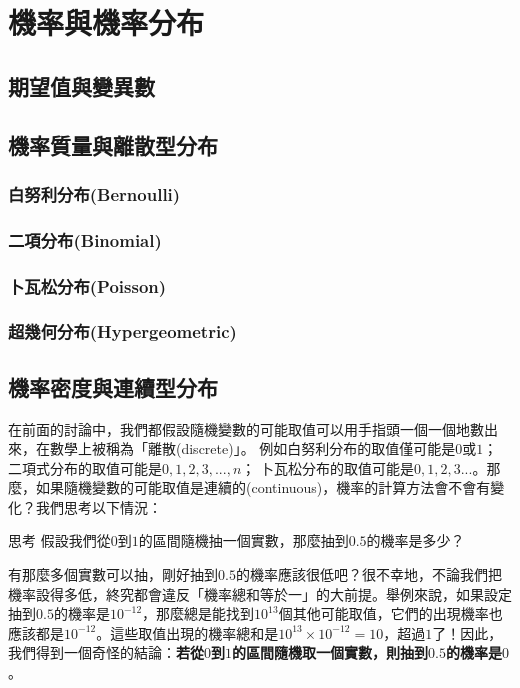 \chapter{機率與機率分布}

\section{期望值與變異數}

\section{機率質量與離散型分布}

\subsection{白努利分布(Bernoulli)}

\subsection{二項分布(Binomial)}

\subsection{卜瓦松分布(Poisson)}

\subsection{超幾何分布(Hypergeometric)}

\section{機率密度與連續型分布}
在前面的討論中，我們都假設隨機變數的可能取值可以用手指頭一個一個地數出來，在數學上被稱為「離散(discrete)」。
例如白努利分布的取值僅可能是$0$或$1$；
二項式分布的取值可能是$0, 1, 2, 3, ..., n$；
卜瓦松分布的取值可能是$0, 1, 2, 3...$。那麼，如果隨機變數的可能取值是連續的(continuous)，機率的計算方法會不會有變化？我們思考以下情況：

\smallskip

\begin{custom}{思考}
假設我們從$0$到$1$的區間隨機抽一個實數，那麼抽到$0.5$的機率是多少？
\end{custom}

\smallskip

有那麼多個實數可以抽，剛好抽到$0.5$的機率應該很低吧？很不幸地，不論我們把機率設得多低，終究都會違反「機率總和等於一」的大前提。舉例來說，如果設定抽到$0.5$的機率是$10^{-12}$，那麼總是能找到$10^{13}$個其他可能取值，它們的出現機率也應該都是$10^{-12}$。這些取值出現的機率總和是$10^{13}\times10^{-12}=10$，超過$1$了！因此，我們得到一個奇怪的結論：\textbf{若從$0$到$1$的區間隨機取一個實數，則抽到$0.5$的機率是$0$}。

